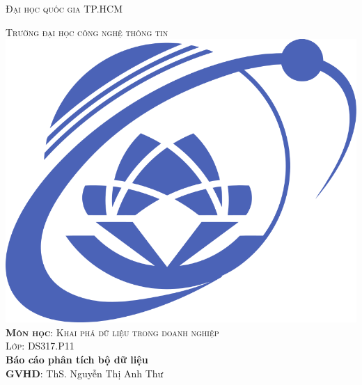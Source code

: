 \documentclass[12pt, a4]{article}
\begin{document}
\begin{titlepage}
    \begin{center}
        \begin{centering}
            \textsc{\LARGE Đại học quốc gia TP.HCM}
        
            
\textsc{\LARGE Trường đại học công nghệ thông tin}\\[1cm] 
        
        \includegraphics[scale=0.25]{figures/UIT_Logo.png}\\[1.0cm]
        

\textsc{\large \textbf{Môn học}: Khai phá dữ liệu trong doanh nghiệp}\\[0.5cm] 
\textsc{\large Lớp: DS317.P11}\\[1cm] 


{\huge \bfseries Báo cáo phân tích bộ dữ liệu}\\[0.3cm]
{\large \textbf{GVHD}: ThS. Nguyễn Thị Anh Thư}\\[1cm] 


\end{centering}
\end{center}
\end{titlepage}
\end{document}
